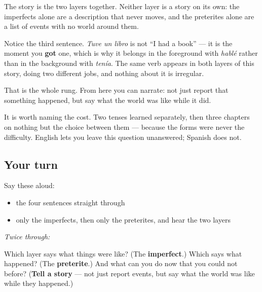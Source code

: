 The story is the two layers together. Neither layer is a story on its own: the imperfects alone are a description that never moves, and the preterites alone are a list of events with no world around them.

\begin{grammarlens}[title={Grammar Lens: what you can now do}]
Notice the third sentence. \emph{Tuve un libro} is not \textquotedblleft{}I had a book\textquotedblright{} — it is the moment you \textbf{got} one, which is why it belongs in the foreground with \emph{hablé} rather than in the background with \emph{tenía}. The same verb appears in both layers of this story, doing two different jobs, and nothing about it is irregular.

That is the whole rung. From here you can narrate: not just report that something happened, but say what the world was like while it did.

It is worth naming the cost. Two tenses learned separately, then three chapters on nothing but the choice between them — because the forms were never the difficulty. English lets you leave this question unanswered; Spanish does not.
\end{grammarlens}

\subsection*{Your turn}
Say these aloud:

\begin{itemize}
\raggedright
  \item the four sentences straight through
  \item only the imperfects, then only the preterites, and hear the two layers
\end{itemize}

\emph{Twice through:}

\begin{tcolorbox}[breakable,colback=teal!4,colframe=teal!35!black,title={Before you move on}]
Which layer says what things were like? (The \textbf{imperfect}.) Which says what happened? (The \textbf{preterite}.) And what can you do now that you could not before? (\textbf{Tell a story} — not just report events, but say what the world was like while they happened.)
\end{tcolorbox}
